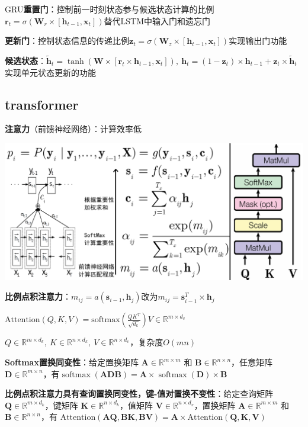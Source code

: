 	GRU\textbf{重置门}：控制前一时刻状态参与候选状态计算的比例$\mathbf{r}_t = \sigma(\mathbf{W}_r \times [\mathbf{h}_{t-1}, \mathbf{x}_t])$替代LSTM中输入门和遗忘门
	
	\textbf{更新门}：控制状态信息的传递比例$\mathbf{z}_t = \sigma(\mathbf{W}_z \times [\mathbf{h}_{t-1}, \mathbf{x}_t])$实现输出门功能
	
	\textbf{候选状态}：$\tilde{\mathbf{h}}_t = \tanh(\mathbf{W} \times [\mathbf{r}_t \times \mathbf{h}_{t-1}, \mathbf{x}_t]),~\mathbf{h}_t = (1 - \mathbf{z}_t) \times \mathbf{h}_{t-1} + \mathbf{z}_t \times \tilde{\mathbf{h}}_t$实现单元状态更新的功能
	
	\subsection*{transformer}
	
	\textbf{注意力}（前馈神经网络）：计算效率低
	
	\begin{figurehere}
		\centering
		\includegraphics[width=1\linewidth]{image07}
		\label{fig:image07}
	\end{figurehere}
	\textbf{比例点积注意力}：$m_{ij}=a(\mathbf{s}_{i-1},\mathbf{h}_j)$改为$m_{ij}=\mathbf{s}_{i-1}^T\times \mathbf{h}_j$
	
	$\text{Attention}(Q,K,V) = \text{softmax}\left(\frac{QK^T}{\sqrt{d_k}} \right) V \in \mathbb{R}^{m \times d_v}$
	
	$Q \in \mathbb{R}^{m \times d_k},~K \in \mathbb{R}^{n \times d_k},~V \in \mathbb{R}^{n \times d_v}$，复杂度$O(mn)$
	
	\textbf{Softmax置换同变性}：给定置换矩阵 $\mathbf{A} \in \mathbb{R}^{m\times m}$ 和 $\mathbf{B} \in \mathbb{R}^{n\times n}$，任意矩阵 $\mathbf{D} \in \mathbb{R}^{m\times n}$，有$
	\operatorname{softmax}(\mathbf{ADB}) = \mathbf{A} \times \operatorname{softmax}(\mathbf{D}) \times \mathbf{B}$
	
	\textbf{比例点积注意力具有查询置换同变性，键-值对置换不变性}：给定查询矩阵 $\mathbf{Q} \in \mathbb{R}^{m\times d_{k}}$，键矩阵 $\mathbf{K} \in \mathbb{R}^{n\times d_{k}}$，值矩阵 $\mathbf{V} \in \mathbb{R}^{n\times d_{v}}$，置换矩阵 $\mathbf{A} \in \mathbb{R}^{m\times m}$ 和 $\mathbf{B} \in \mathbb{R}^{n\times n}$，有	$	\text{Attention}(\mathbf{AQ}, \mathbf{BK}, \mathbf{BV}) = \mathbf{A} \times \text{Attention}(\mathbf{Q}, \mathbf{K}, \mathbf{V})$
	
